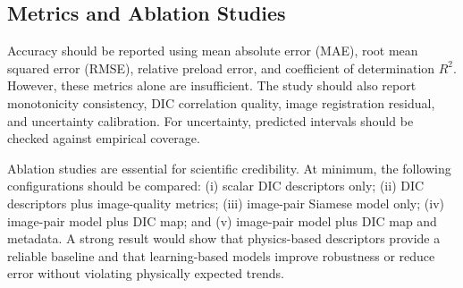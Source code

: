 
\subsection{Metrics and Ablation Studies}

Accuracy should be reported using mean absolute error (MAE), root mean squared error (RMSE), relative preload error, and coefficient of determination $R^2$. However, these metrics alone are insufficient. The study should also report monotonicity consistency, DIC correlation quality, image registration residual, and uncertainty calibration. For uncertainty, predicted intervals should be checked against empirical coverage.

Ablation studies are essential for scientific credibility. At minimum, the following configurations should be compared: (i) scalar DIC descriptors only; (ii) DIC descriptors plus image-quality metrics; (iii) image-pair Siamese model only; (iv) image-pair model plus DIC map; and (v) image-pair model plus DIC map and metadata. A strong result would show that physics-based descriptors provide a reliable baseline and that learning-based models improve robustness or reduce error without violating physically expected trends.
